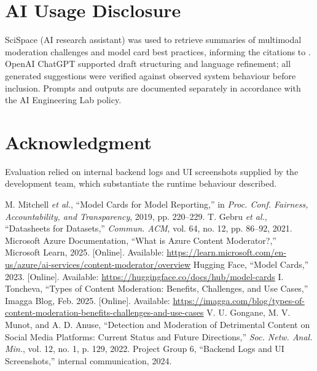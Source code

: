 \documentclass[conference]{IEEEtran}
\begin{document}
\section{AI Usage Disclosure}
SciSpace (AI research assistant) was used to retrieve summaries of multimodal moderation challenges and model card best practices, informing the citations to \cite{gongane2022detection, mitchell2019modelcards, gebru2021datasheets, huggingface2023modelcards}. OpenAI ChatGPT supported draft structuring and language refinement; all generated suggestions were verified against observed system behaviour before inclusion. Prompts and outputs are documented separately in accordance with the AI Engineering Lab policy.

\section*{Acknowledgment}
Evaluation relied on internal backend logs and UI screenshots supplied by the development team, which substantiate the runtime behaviour described.

\begin{thebibliography}{00}
 M. Mitchell \emph{et al.}, ``Model Cards for Model Reporting,'' in \emph{Proc. Conf. Fairness, Accountability, and Transparency}, 2019, pp. 220--229.
 T. Gebru \emph{et al.}, ``Datasheets for Datasets,'' \emph{Commun. ACM}, vol. 64, no. 12, pp. 86--92, 2021.
 Microsoft Azure Documentation, ``What is Azure Content Moderator?,'' Microsoft Learn, 2025. [Online]. Available: \url{https://learn.microsoft.com/en-us/azure/ai-services/content-moderator/overview}
 Hugging Face, ``Model Cards,'' 2023. [Online]. Available: \url{https://huggingface.co/docs/hub/model-cards}
 I. Toncheva, ``Types of Content Moderation: Benefits, Challenges, and Use Cases,'' Imagga Blog, Feb. 2025. [Online]. Available: \url{https://imagga.com/blog/types-of-content-moderation-benefits-challenges-and-use-cases}
 V. U. Gongane, M. V. Munot, and A. D. Anuse, ``Detection and Moderation of Detrimental Content on Social Media Platforms: Current Status and Future Directions,'' \emph{Soc. Netw. Anal. Min.}, vol. 12, no. 1, p. 129, 2022.
 Project Group 6, ``Backend Logs and UI Screenshots,'' internal communication, 2024.
\end{thebibliography}
\end{document}
